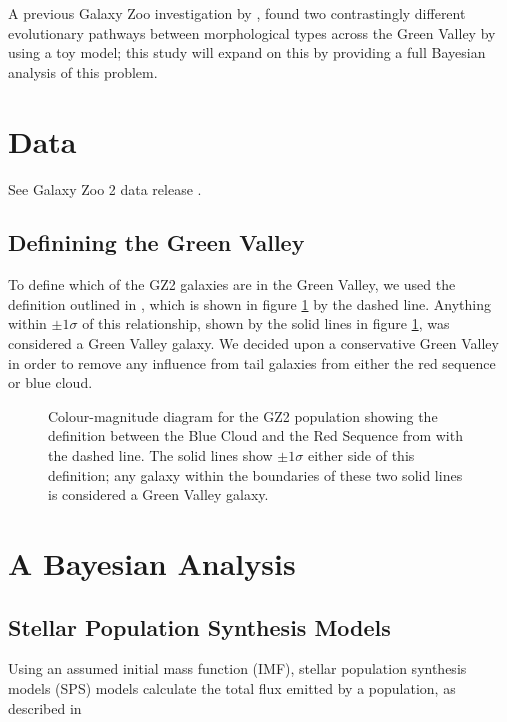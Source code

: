 \documentclass{mn2e}
\begin{document}
A previous Galaxy Zoo investigation by  \cite{Sch2014}, found two contrastingly different evolutionary pathways between morphological types across the Green Valley by using a toy model; this study will expand on this by providing a full Bayesian analysis of this problem.
\section{Data}
See Galaxy Zoo 2 data release \cite{GZ2}.
\subsection{Definining the Green Valley}
To define which of the GZ2 galaxies are in the Green Valley, we used the definition outlined in \citet{Baldry}, which is shown in figure \ref{CMGV} by the dashed line. Anything within $\pm 1\sigma$ of this relationship, shown by the solid lines in figure \ref{CMGV}, was considered a Green Valley galaxy. We decided upon a conservative Green Valley in order to remove any influence from tail galaxies from either the red sequence or blue cloud.

\begin{figure}
\caption{Colour-magnitude diagram for the GZ2 population showing the definition between the Blue Cloud and the Red Sequence from \citet{Baldry} with the dashed line. The solid lines show $\pm 1\sigma$ either side of this definition; any galaxy within the boundaries of these two solid lines is considered a Green Valley galaxy.}
\label{CMGV}
\end{figure}

\section{A Bayesian Analysis}
\subsection{Stellar Population Synthesis Models}
Using an assumed initial mass function (IMF),  stellar population synthesis models (SPS) models calculate the total flux emitted by a population, as described in \cite{BC03}
\end{document}
